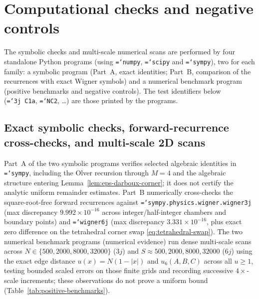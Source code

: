 \documentclass[11pt]{article}
\theoremstyle{definition}
\theoremstyle{remark}
\renewcommand{\_}{\oldunderscore\penalty0\hskip0pt\relax}
\let\oldtexttt\texttt
\renewcommand{\texttt}[1]{\oldtexttt{\hyphenchar\font=`\-\relax #1}}
\begin{document}
\appendix
\section{Computational checks and negative controls}
\label{sec:numerics}

The symbolic checks and multi-scale numerical scans are performed by four standalone Python programs (using \texttt{numpy},
  \texttt{scipy} and \texttt{sympy}), two for each family: a symbolic program (Part~A, exact identities; Part~B, comparison of
  the recurrences with exact Wigner symbols) and a numerical benchmark program (positive benchmarks and negative controls). The
  test identifiers below (\texttt{3j~C1a}, \texttt{NC2}, \dots) are those printed by the programs.

\subsection{Exact symbolic checks, forward-recurrence cross-checks, and multi-scale 2D scans}
Part~A of the two symbolic programs verifies selected algebraic identities in \texttt{sympy}, including the Olver recursion
  through $M=4$ and the algebraic structure entering Lemma~\ref{lem:eps-darboux-corner}; it does not certify the analytic uniform
  remainder estimates. Part~B numerically cross-checks the square-root-free forward recurrences against
  \texttt{sympy.physics.wigner.wigner\_3j} (max discrepancy $9.992\times 10^{-16}$ across integer/half-integer chambers and
  boundary points) and \texttt{wigner\_6j} (max discrepancy $3.331\times 10^{-16}$, plus exact zero difference on the tetrahedral
  corner swap \eqref{eq:tetrahedral-swap}). The two numerical benchmark programs (numerical evidence)
  run dense multi-scale scans across $N\in\{500,2000,8000,32000\}$ ($3j$) and $S\approx 500,2000,8000,32000$ ($6j$) using the
  exact edge distance $u(x)=N(1-|x|)$ and $u_6(A,B,C)$ across all $u\ge 1$, testing bounded scaled errors on those finite grids
  and recording successive $4\times$-scale increments; these observations do not prove a uniform bound
  (Table~\ref{tab:positive-benchmarks}).
\end{document}

